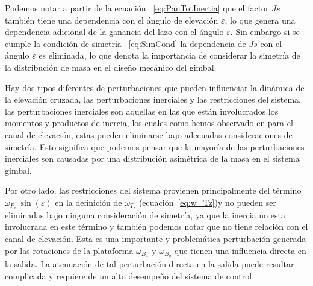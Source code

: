 Podemos notar a partir de la ecuaci\'{o}n ~\ref{eq:PanTotInertia} que el factor $Js$ tambi\'{e}n tiene una dependencia con el \'{a}ngulo de elevaci\'{o}n $\varepsilon$, lo que genera una dependencia adicional de la ganancia del lazo con el \'{a}ngulo $\varepsilon$. Sin embargo si se cumple la condici\'{o}n de simetr\'{i}a ~\ref{eq:SimCond} la dependencia de $Js$ con el \'{a}ngulo $\varepsilon$ es eliminada, lo que denota la importancia de considerar la simetr\'{i}a de la distribuci\'{o}n de masa en el dise\~{n}o mec\'{a}nico del gimbal.

Hay dos tipos diferentes de perturbaciones que pueden influenciar la din\'{a}mica de la elevaci\'{o}n cruzada, las perturbaciones inerciales y las restricciones del sistema, las perturbaciones inerciales son aquellas en las que est\'{a}n involucrados los momentos y productos de inercia, los cuales como hemos observado en para el canal de elevaci\'{o}n, estas pueden eliminarse bajo adecuadas consideraciones de simetr\'{i}a. Esto significa que podemos pensar que la mayor\'{i}a de las perturbaciones inerciales son causadas por una distribuci\'{o}n asim\'{e}trica de la masa en el sistema gimbal. 

Por otro lado, las restricciones del sistema provienen principalmente del t\'{e}rmino $\omega_{P_x} \, \sin (\varepsilon)$ en la definici\'{o}n de $\omega_{T_z}$ (ecuaci\'{o}n~\ref{eq:w_Tz})y no pueden ser eliminadas bajo ninguna consideraci\'{o}n de simetr\'{i}a, ya que la inercia no esta involucrada en este t\'{e}rmino y tambi\'{e}n podemos notar que no tiene relaci\'{o}n con el canal de elevaci\'{o}n. Esta es una importante y problem\'{a}tica perturbaci\'{o}n generada por las rotaciones de la plataforma $\omega_{B_x}$ y $\omega_{B_y}$ que tienen una influencia directa en la salida. La atenuaci\'{o}n de tal perturbaci\'{o}n directa en la salida puede resultar complicada y requiere de un alto desempe\~{n}o del sistema de control.

   
